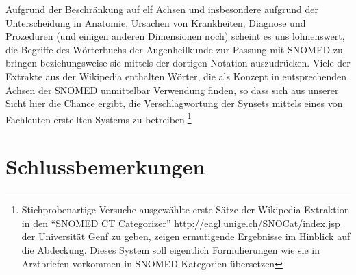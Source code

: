 \documentclass[pagesize,paper=A4,DIV=calc,fontsize=12pt,draft=false]{scrreprt}
\begin{document}
Aufgrund der Beschränkung auf elf Achsen und insbesondere aufgrund der Unterscheidung in Anatomie, Ursachen von Krankheiten, Diagnose und Prozeduren (und einigen anderen Dimensionen noch) scheint es uns lohnenswert, die Begriffe des Wörterbuchs der Augenheilkunde zur Passung mit SNOMED zu bringen beziehungsweise sie mittels der dortigen Notation auszudrücken.
Viele der Extrakte aus der Wikipedia enthalten Wörter, die als Konzept in entsprechenden Achsen der SNOMED unmittelbar Verwendung finden, so dass sich aus unserer Sicht hier die Chance ergibt, die Verschlagwortung der Synsets mittels eines von Fachleuten erstellten Systems zu betreiben.\footnote{Stichprobenartige Versuche ausgewählte erste Sätze der Wikipedia-Extraktion in den \enquote{SNOMED CT Categorizer} \href{http://eagl.unige.ch/SNOCat/index.jsp}{http://eagl.unige.ch/SNOCat/index.jsp} der Universität Genf zu geben, zeigen ermutigende Ergebnisse im Hinblick auf die Abdeckung. Dieses System soll eigentlich Formulierungen wie sie in Arztbriefen vorkommen in SNOMED-Kategorien übersetzen}


\section{Schlussbemerkungen}
\end{document}
